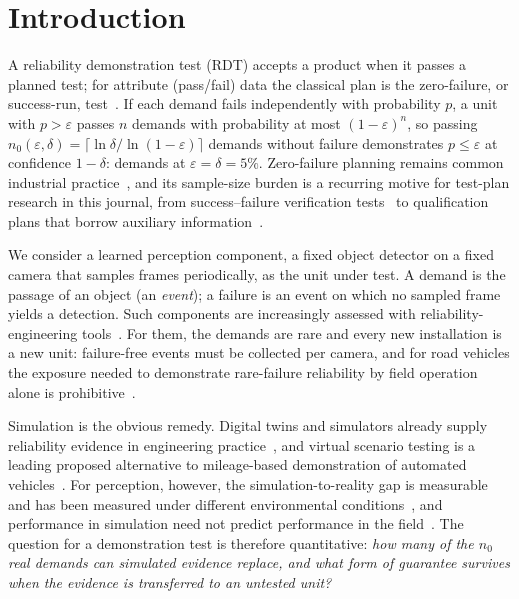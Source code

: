 \section{Introduction}\label{sec:intro}

A reliability demonstration test (RDT) accepts a product when it passes a planned test; for attribute (pass/fail) data
the classical plan is the zero-failure, or success-run, test~\cite{hanley1983,meeker2017}. If each demand fails
independently with probability $p$, a unit with $p>\varepsilon$ passes $n$ demands with probability at most
$(1-\varepsilon)^n$, so passing $n_0(\varepsilon,\delta)=\lceil\ln\delta/\ln(1-\varepsilon)\rceil$ demands without
failure demonstrates $p\le\varepsilon$ at confidence $1-\delta$: \nNzero{} demands at $\varepsilon=\delta=5\%$. Zero-failure
planning remains common industrial practice~\cite{yoon2025bayesian}, and its sample-size burden is a recurring motive for
test-plan research in this journal, from success--failure verification tests~\cite{ding2024truncated} to qualification
plans that borrow auxiliary information~\cite{wang2024monoprop,tan2025weibull}.

We consider a learned perception component, a fixed object detector on a fixed camera that samples frames
periodically, as the unit under test. A demand is the passage of an object (an \emph{event}); a failure is an event on
which no sampled frame yields a detection. Such components are increasingly assessed with reliability-engineering
tools~\cite{wen2025nversion,paterson2025amlas,aghazadeh2026hipllm}. For them, the demands are rare and every new
installation is a new unit: \nNzero{} failure-free events must be collected per camera, and for road vehicles the
exposure needed to demonstrate rare-failure reliability by field operation alone is prohibitive~\cite{kalra2016}.

Simulation is the obvious remedy. Digital twins and simulators already supply reliability evidence in engineering
practice~\cite{tao2024subsea,ye2023structuraldt,wang2026fusion}, and virtual scenario testing is a leading proposed alternative to mileage-based demonstration of automated vehicles~\cite{riedmaier2020,zhao2025statfoundation}. For perception,
however, the simulation-to-reality gap is measurable and has been measured under different environmental conditions~\cite{reway2020simgap,dieter2023drone}, and
performance in simulation need not predict performance in the field~\cite{kadian2020}. The question for a demonstration
test is therefore quantitative: \emph{how many of the $n_0$ real demands can simulated evidence replace, and what form of
guarantee survives when the evidence is transferred to an untested unit?}

